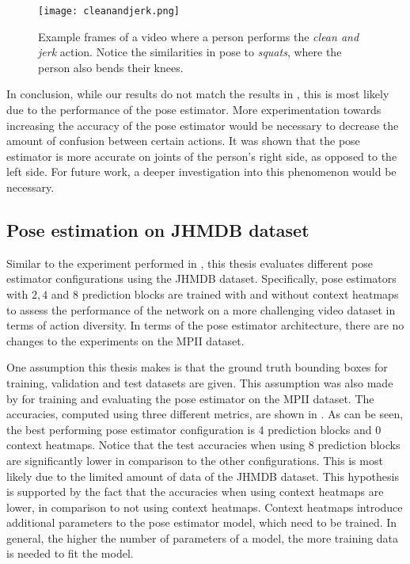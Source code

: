 \begin{figure}[htb!]
    \centering
    \texttt{[image: cleanandjerk.png]}
    \caption{Example frames of a video where a person performs the \textit{clean and jerk} action. Notice the similarities in pose to \textit{squats}, where the person also bends their knees.}
    \label{fig:cleanandjerk}
\end{figure}

In conclusion, while our results do not match the results in \cite{luvizon_2d/3d_2018}, this is most likely due to the performance of the pose estimator.
More experimentation towards increasing the accuracy of the pose estimator would be necessary to decrease the amount of confusion between certain actions.
It was shown that the pose estimator is more accurate on joints of the person's right side, as opposed to the left side.
For future work, a deeper investigation into this phenomenon would be necessary. 

\subsection{Pose estimation on JHMDB dataset}
\label{sec:exp-pose-jhmdb}
Similar to the experiment performed in , this thesis evaluates different pose estimator configurations using the JHMDB dataset.
Specifically, pose estimators with $2, 4$ and $8$ prediction blocks are trained with and without context heatmaps to assess the performance of the network on a more challenging video dataset in terms of action diversity.
In terms of the pose estimator architecture, there are no changes to the experiments on the MPII dataset.

One assumption this thesis makes is that the ground truth bounding boxes for training, validation and test datasets are given.
This assumption was also made by \cite{luvizon_2d/3d_2018} for training and evaluating the pose estimator on the MPII dataset.
The accuracies, computed using three different metrics, are shown in .
As can be seen, the best performing pose estimator configuration is $4$ prediction blocks and $0$ context heatmaps.
Notice that the test accuracies when using $8$ prediction blocks are significantly lower in comparison to the other configurations.
This is most likely due to the limited amount of data of the JHMDB dataset.
This hypothesis is supported by the fact that the accuracies when using context heatmaps are lower, in comparison to not using context heatmaps.
Context heatmaps introduce additional parameters to the pose estimator model, which need to be trained.
In general, the higher the number of parameters of a model, the more training data is needed to fit the model.

